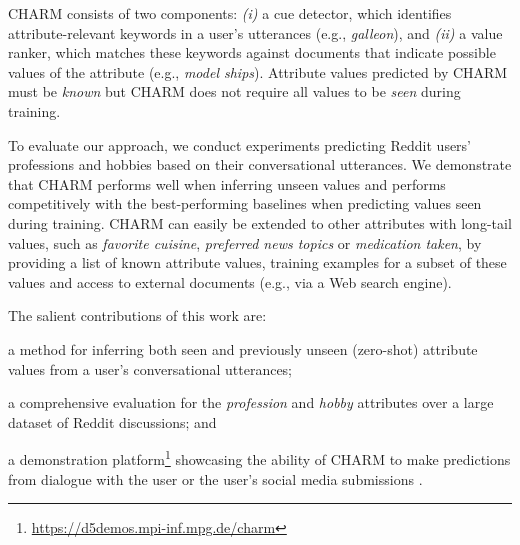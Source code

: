 CHARM consists of two components: \emph{(i)} a cue detector, which identifies attribute-relevant keywords in a user's utterances 
(e.g., \textit{galleon}), and \emph{(ii)} a value ranker, which matches these keywords against documents that indicate possible values of the attribute (e.g., \textit{model ships}). 
Attribute values predicted by CHARM must be \textit{known} but CHARM does not require all values to be \textit{seen} during training. 

To evaluate our approach, we conduct experiments predicting Reddit users' professions and hobbies based on their conversational utterances. We demonstrate that CHARM performs well when inferring unseen values and performs competitively with the best-performing baselines when 
predicting values seen during training. 
CHARM can easily be extended to other attributes with long-tail values, such as 
{\em favorite cuisine}, {\em preferred news topics} or {\em medication taken}, by providing a list of known attribute values, training examples for a subset of these values and access to external documents (e.g., via a Web search engine).

\vspace{0.1cm}
The salient contributions of this work are:
\squishlist
    \item a method for inferring both seen and previously unseen (zero-shot) attribute values from a user's conversational utterances;
    \item a comprehensive evaluation 
    for the \textit{profession} and \textit{hobby} attributes over a large dataset of Reddit discussions;
and \item a demonstration platform\footnote{\url{https://d5demos.mpi-inf.mpg.de/charm}} showcasing the ability of CHARM to make predictions from dialogue with the user or the user's social media submissions \cite{tigunova2021exploring}.
\squishend
